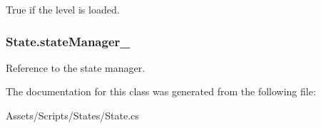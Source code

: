 True if the level is loaded.

\hypertarget{class_state_aae3bd29dddcbe7d41cd54473acf57c83}{
\subsubsection[{state\-Manager\-\_\-}]{ State.\-state\-Manager\-\_\-\hspace{0.3cm}{\ttfamily [protected]}}}\label{class_state_aae3bd29dddcbe7d41cd54473acf57c83}


Reference to the state manager.



The documentation for this class was generated from the following file\-:\begin{DoxyCompactItemize}
\item 
Assets/\-Scripts/\-States/State.\-cs\end{DoxyCompactItemize}
